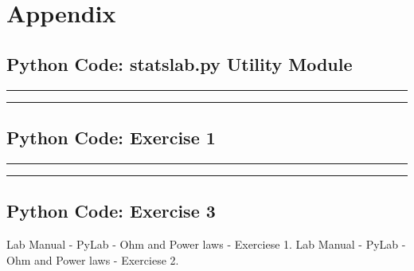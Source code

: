 \documentclass[letterpaper,12pt]{article}
\begin{document}
\section*{\hfil Appendix\hfil}

\subsection*{Python Code: statslab.py Utility Module}

\noindent\rule{\textwidth}{1pt}

\noindent\rule{\textwidth}{1pt}

\pagebreak

\subsection*{Python Code: Exercise 1}
\noindent\rule{\textwidth}{1pt}

\noindent\rule{\textwidth}{1pt}

\pagebreak

\subsection*{Python Code: Exercise 3}

\pagebreak

\begin{thebibliography}{99}

 Lab Manual - PyLab - Ohm and Power laws - Exerciese 1.
 Lab Manual - PyLab - Ohm and Power laws - Exerciese 2.

\end{thebibliography}
\end{document}
